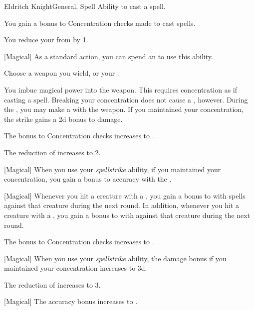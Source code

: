     \begin{feat}{Eldritch Knight}{General, Spell}
        \featpre Ability to cast a spell.
        \featben

         You gain a  bonus to Concentration checks made to cast spells.

         You reduce your  from  by 1.

        [Magical] As a standard action, you can spend an  to use this ability.
        \begin{ability}
            \begin{spelltargetinginfo}
                \spellspecial Choose a weapon you wield, or your .
            \end{spelltargetinginfo}
            \begin{spelleffects}
                \spelleffect You imbue magical power into the weapon.
                This requires concentration as if casting a spell.
                Breaking your concentration does not cause a , however.
                During the , you may make a  with the weapon.
                If you maintained your concentration, the strike gains a \plus2d bonus to damage.
            \end{spelleffects}
        \end{ability}

         The bonus to Concentration checks increases to .

         The reduction of  increases to 2.

        [Magical] When you use your \textit{spellstrike} ability, if you maintained your concentration, you gain a  bonus to accuracy with the .

        [Magical] Whenever you hit a creature with a , you gain a  bonus to  with spells against that creature during the next round.
        In addition, whenever you hit a creature with a , you gain a  bonus to  with  against that creature during the next round.

         The bonus to Concentration checks increases to .

        [Magical] When you use your \textit{spellstrike} ability, the damage bonus if you maintained your concentration increases to \plus3d.

         The reduction of  increases to 3.

        [Magical] The accuracy bonus increases to .
    \end{feat}

